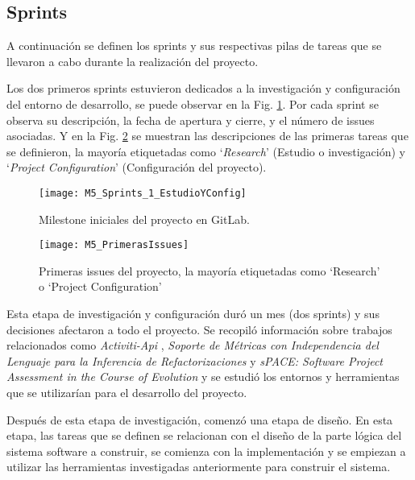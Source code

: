 \subsection{Sprints}
A continuación se definen los sprints y sus respectivas pilas de tareas que se llevaron a cabo durante la realización del proyecto. 

Los dos primeros sprints estuvieron dedicados a la investigación y configuración del entorno de desarrollo, se puede observar en la Fig. \ref{fig:M5_Sprints_1_EstudioYConfig}. Por cada sprint se observa su descripción, la fecha de apertura y cierre, y el número de issues asociadas. Y en la Fig. \ref{fig:M5_PrimerasIssues} se muestran las descripciones de las primeras tareas que se definieron, la mayoría etiquetadas como `\textit{Research}' (Estudio o investigación) y `\textit{Project Configuration}' (Configuración del proyecto).

\begin{figure}[!h]
	\centering
	\texttt{[image: M5\_Sprints\_1\_EstudioYConfig]}
	\caption{Milestone iniciales del proyecto en GitLab.}
	\label{fig:M5_Sprints_1_EstudioYConfig}
\end{figure}

\begin{figure}[!h]
	\centering
	\texttt{[image: M5\_PrimerasIssues]}
	\caption{Primeras issues del proyecto, la mayoría etiquetadas como `Research' o `Project Configuration'}
	\label{fig:M5_PrimerasIssues}
\end{figure}

Esta etapa de investigación y configuración duró un mes (dos sprints) y sus decisiones afectaron a todo el proyecto. Se recopiló información sobre trabajos relacionados como \textit{Activiti-Api} \cite{rlp0019_software_2019}, \textit{Soporte de Métricas con Independencia del Lenguaje para la Inferencia de Refactorizaciones}  \cite{marticorena_soporte_2005} y \textit{sPACE: Software Project Assessment in the Course of Evolution} \cite{ratzinger_space:_2007} y se estudió los entornos y herramientas que se utilizarían para el desarrollo del proyecto.

Después de esta etapa de investigación, comenzó una etapa de diseño. En esta etapa, las tareas que se definen se relacionan con el diseño de la parte lógica del sistema software a construir, se comienza con la implementación y se empiezan a utilizar las herramientas investigadas anteriormente para construir el sistema. 

